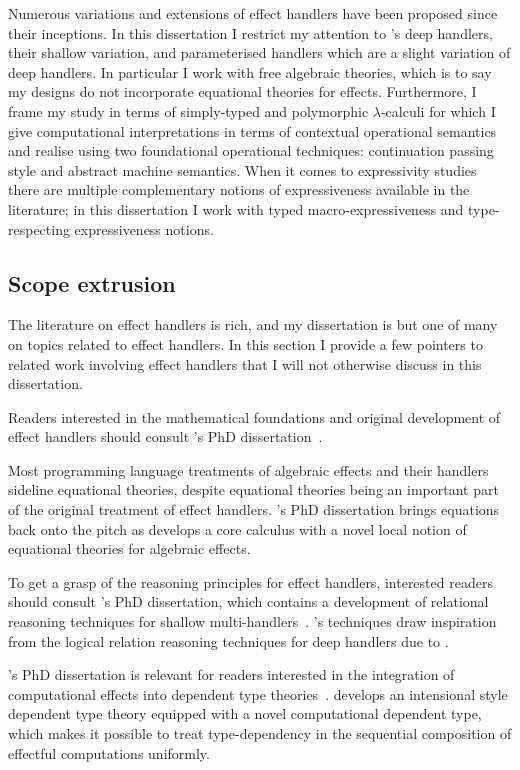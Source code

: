 \documentclass[12pt,phd,lfcs,twoside,openright,logo,leftchapter,normalheadings]{infthesis}
\theoremstyle{plain}
\theoremstyle{definition}
\begin{document}
Numerous variations and extensions of effect handlers have been
proposed since their inceptions.  In this dissertation I restrict my
attention to \citeauthor{PlotkinP09}'s deep handlers, their shallow
variation, and parameterised handlers which are a slight variation of
deep handlers. In particular I work with free algebraic theories,
which is to say my designs do not incorporate equational theories for
effects. Furthermore, I frame my study in terms of simply-typed and
polymorphic $\lambda$-calculi for which I give computational
interpretations in terms of contextual operational semantics and
realise using two foundational operational techniques: continuation
passing style and abstract machine semantics. When it comes to
expressivity studies there are multiple complementary notions of
expressiveness available in the literature; in this dissertation I
work with typed macro-expressiveness and type-respecting
expressiveness notions.

\subsection{Scope extrusion}
The literature on effect handlers is rich, and my dissertation is but
one of many on topics related to effect handlers. In this section I
provide a few pointers to related work involving effect handlers that
I will not otherwise discuss in this dissertation.

Readers interested in the mathematical foundations and original
development of effect handlers should consult \citeauthor{Pretnar10}'s
PhD dissertation~\cite{Pretnar10}.

Most programming language treatments of algebraic effects and their
handlers sideline equational theories, despite equational theories
being an important part of the original treatment of effect
handlers. \citeauthor{Ziga20}'s PhD dissertation brings equations back
onto the pitch as \citet{Ziga20} develops a core calculus with a novel
local notion of equational theories for algebraic effects.

To get a grasp of the reasoning principles for effect handlers,
interested readers should consult \citeauthor{McLaughlin20}'s PhD
dissertation, which contains a development of relational reasoning
techniques for shallow
multi-handlers~\cite{McLaughlin20}. \citeauthor{McLaughlin20}'s
techniques draw inspiration from the logical relation reasoning
techniques for deep handlers due to \citet{BiernackiPPS18}.

\citeauthor{Ahman17}'s PhD dissertation is relevant for readers
interested in the integration of computational effects into dependent
type theories~\cite{Ahman17}. \citeauthor{Ahman17} develops an
intensional \citet{MartinLof84} style dependent type theory equipped
with a novel computational dependent type, which makes it possible to
treat type-dependency in the sequential composition of effectful
computations uniformly.
\end{document}
